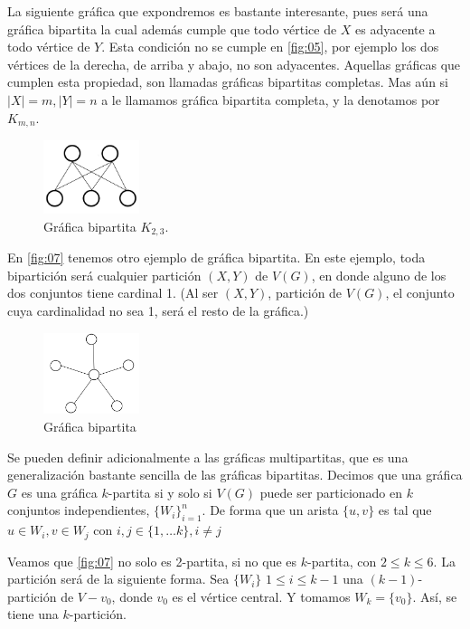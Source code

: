 La siguiente gráfica que expondremos es bastante interesante, pues será una gráfica bipartita la cual además cumple que todo vértice de $X$ es adyacente a todo vértice de $Y$.
Esta condición no se cumple en \cref{fig:05}, por ejemplo los dos vértices de la derecha, de arriba y abajo, no son adyacentes. Aquellas gráficas que cumplen esta propiedad, son llamadas gráficas bipartitas completas. Mas aún si $|X| = m, |Y| = n $ a le llamamos gráfica bipartita completa, y la denotamos por $K_{m,n}$.


\begin{figure}[H]
  \centering
  \includegraphics[width=0.25\textwidth]{recursos/capturas/06.jpg}
  \caption{Gráfica bipartita $K_{2,3}$.}
  \label{fig:11}
\end{figure}

En \cref{fig:07} tenemos otro ejemplo de gráfica bipartita.
En este ejemplo, toda bipartición será cualquier partición $(X,Y)$ de $V(G)$, en donde alguno de los dos conjuntos tiene cardinal 1. (Al ser $(X,Y)$, partición de $V(G)$, el conjunto cuya cardinalidad no sea 1, será el resto de la gráfica.)

\begin{figure}[H]
  \centering
  \includegraphics[width=0.25\textwidth]{recursos/capturas/07.jpg}
  \caption{Gráfica bipartita}
  \label{fig:12}
\end{figure}

Se pueden definir adicionalmente a las gráficas multipartitas, que es una generalización bastante sencilla de las gráficas bipartitas. Decimos que una gráfica $G$ es una gráfica $k$-partita si y solo si $V(G)$ puede ser particionado en $k$ conjuntos independientes, $\{W_i\}_{i=1}^n$. De forma que un arista $\{u,v\}$ es tal que $u\in W_i, v\in W_j$ con $i,j\in \{1, \dots k\}, i\neq j$ 

Veamos que \cref{fig:07} no solo es 2-partita, si no que es $k$-partita, con $2\leq k \leq 6$. La partición será de la siguiente forma. Sea $\{W_i\}$ $1\leq i\leq k-1$ una $(k-1)$-partición de $V-v_0$, donde $v_0 $ es el vértice central. Y tomamos $W_k=\{v_0\}$. Así, se tiene una $k$-partición.

